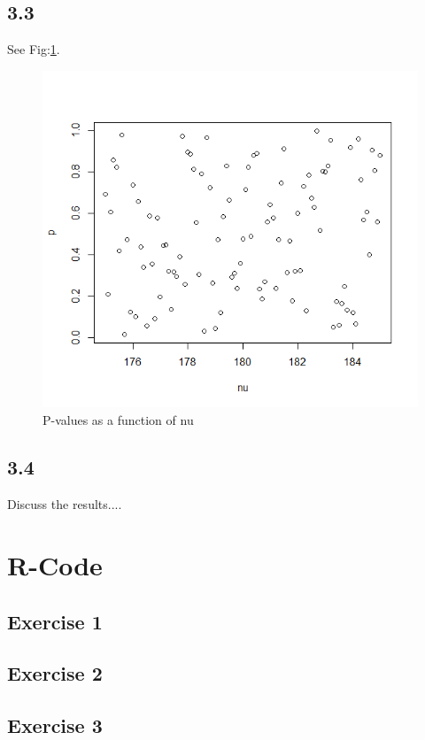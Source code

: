 \documentclass{article}
\begin{document}
    \subsection{3.3}
      See Fig:\ref{fig:3_3}.
      \begin{figure}
        \centering
        \includegraphics[width=.8\linewidth]{results/3_3}
        \caption{P-values as a function of nu}
        \label{fig:3_3}
      \end{figure}

    \subsection{3.4}
      Discuss the results....

  \section{R-Code}
    \subsection{Exercise 1}\label{sub:R1}

    \subsection{Exercise 2}\label{sub:R2}

    \subsection{Exercise 3}\label{sub:R3}
\end{document}
